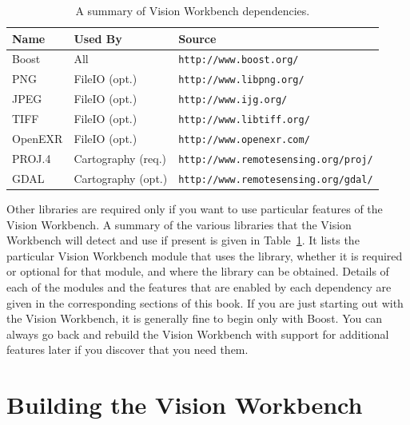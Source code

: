 \begin{table}[t]\begin{centering}
\begin{tabular}{|l|l|l|} \hline
Name    & Used By            & Source                                   \\ \hline \hline
Boost   & All                & \verb#http://www.boost.org/#              \\ \hline
PNG     & FileIO (opt.)      & \verb#http://www.libpng.org/#             \\ \hline
JPEG    & FileIO (opt.)      & \verb#http://www.ijg.org/#                \\ \hline
TIFF    & FileIO (opt.)      & \verb#http://www.libtiff.org/#            \\ \hline
OpenEXR & FileIO (opt.)      & \verb#http://www.openexr.com/#            \\ \hline
PROJ.4  & Cartography (req.) & \verb#http://www.remotesensing.org/proj/# \\ \hline
GDAL    & Cartography (opt.) & \verb#http://www.remotesensing.org/gdal/# \\ \hline
\end{tabular}
\caption{A summary of Vision Workbench dependencies.}
\label{tbl:dependencies}
\end{centering}\end{table}

Other libraries are required only if you want to use particular
features of the Vision Workbench.  A summary of the various libraries
that the Vision Workbench will detect and use if present is given in
Table~\ref{tbl:dependencies}.  It lists the particular Vision
Workbench module that uses the library, whether it is required or
optional for that module, and where the library can be obtained.
Details of each of the modules and the features that are enabled by
each dependency are given in the corresponding sections of this book.
If you are just starting out with the Vision Workbench, it is
generally fine to begin only with Boost.  You can always go back and 
rebuild the Vision Workbench with support for additional features 
later if you discover that you need them.

\section{Building the Vision Workbench}

